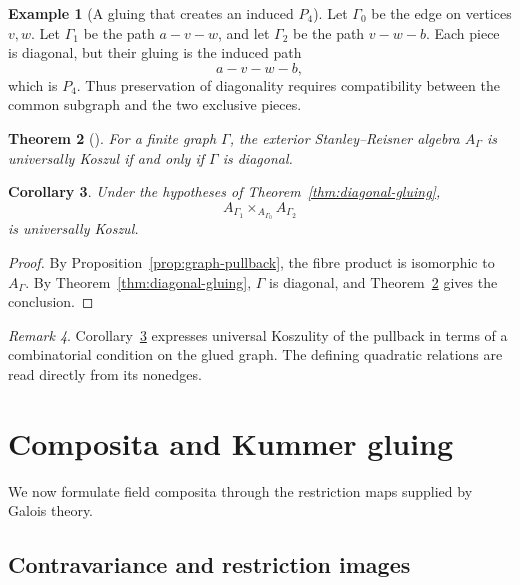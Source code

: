 \documentclass[12pt]{amsart}
\theoremstyle{plain}
\newtheorem{theorem}{Theorem}[section]
\newtheorem{corollary}[theorem]{Corollary}
\theoremstyle{definition}
\newtheorem{example}[theorem]{Example}
\theoremstyle{remark}
\newtheorem{remark}[theorem]{Remark}
\numberwithin{equation}{section}
\begin{document}
\begin{example}[A gluing that creates an induced \(P_4\)]
Let \(\Gamma_0\) be the edge on vertices \(v,w\). Let \(\Gamma_1\) be
the path \(a-v-w\), and let \(\Gamma_2\) be the path \(v-w-b\). Each
piece is diagonal, but their gluing is the induced path
\[
a-v-w-b,
\]
which is \(P_4\). Thus preservation of diagonality requires compatibility
between the common subgraph and the two exclusive pieces.
\end{example}

\begin{theorem}[{\cite[Theorem~4.6]{CassellaQuadrelli}}]
\label{thm:CQ}
For a finite graph \(\Gamma\), the exterior Stanley--Reisner algebra
\(A_\Gamma\) is universally Koszul if and only if \(\Gamma\) is
diagonal.
\end{theorem}

\begin{corollary}
\label{cor:graph-uk}
Under the hypotheses of Theorem~\ref{thm:diagonal-gluing},
\[
A_{\Gamma_1}\times_{A_{\Gamma_0}}A_{\Gamma_2}
\]
is universally Koszul.
\end{corollary}

\begin{proof}
By Proposition~\ref{prop:graph-pullback}, the fibre product is
isomorphic to \(A_\Gamma\). By
Theorem~\ref{thm:diagonal-gluing}, \(\Gamma\) is diagonal, and
Theorem~\ref{thm:CQ} gives the conclusion.
\end{proof}

\begin{remark}
Corollary~\ref{cor:graph-uk} expresses universal Koszulity of the pullback in
terms of a combinatorial condition on the glued graph. The defining
quadratic relations are read directly from its nonedges.
\end{remark}

\section{Composita and Kummer gluing}
\label{sec:composita}

We now formulate field composita through the restriction maps supplied by
Galois theory.

\subsection{Contravariance and restriction images}
\end{document}

